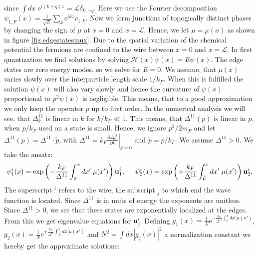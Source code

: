 since $\int dx\; \text{e}^{i(k + q)x} =\mathcal{L} \delta_{k,-q} $. Here we use the Fourier decomposition $\psi_{1,F}(x) = \frac{1}{\sqrt{L}}\sum_k\text{e}^{ikx}c_{1,k}$. Now we form junctions of topogically distinct phases by changing the sign of $\mu$ at $x = 0$ and $x = \mathcal{L}$. Hence, we let $\mu = \mu(x)$ as shown in figure \ref{fig.edgestatesmux}. Due to the spatial variation of the chemical potential the fermions are confined to the wire between $x = 0$ and $x = \mathcal{L}$. In first quantization we find solutions by solving $\mathcal{H}(x)\psi(x) = E\psi(x)$. The edge states are zero energy modes, so we solve for $E = 0$. We assume, that $\mu(x)$ varies slowly over the interparticle length scale $1/k_F$. When this is fulfilled the solution $\psi(x)$ will also vary slowly and hence the curvature of $\psi(x)$ proportional to $p^2\psi(x)$ is negligible. This means, that to a good approximation we only keep the operator $p$ up to first order. In the numerical analysis we will see, that $\Delta^{11}_k$ is linear in $k$ for $k/k_F \ll 1$. This means, that $\Delta^{11}(p)$ is linear in $p$, when $p/k_F$ used on a state is small. Hence, we ignore $p^2/2m_F$ and let $\Delta^{11}(p) = \Delta^{11} \cdot \tilde{p}$, with $\Delta^{11} = k_F\left.\frac{\partial \Delta^{11}_k}{\partial k}\right|_{k=0}$ and $\tilde{p} = p/k_F$. We assume $\Delta^{11} > 0$. We take the ansatz:
\begin{equation}
\psi^{i}_1(x) = \exp\left(-\frac{k_F}{\Delta^{11}}\int_{0}^{x} dx'\; \mu(x') \right)\mathbf{u}^{i}_{1}, \hspace{0.5cm} \psi^{i}_2(x) = \exp\left(+\frac{k_F}{\Delta^{11}}\int_{\mathcal{L}}^{x} dx'\; \mu(x') \right)\mathbf{u}^{i}_{2}, \nonumber
\end{equation}  
The superscript ${}^i$ refers to the wire, the subscript ${}_j$ to which end the wave function is located. Since $\Delta^{11}$ is in units of energy the exponents are unitless. Since $\Delta^{11} > 0$, we see that these states are exponentially localized at the edges. From this we get eigenvalue equations for $\mathbf{u}^{i}_{j}$. Defining $g_1(x) = \frac{1}{N}\text{e}^{-\frac{k_F}{\Delta^{11}}\int_{0}^{x} dx' \mu(x')}$, $g_2(x) = \frac{1}{N}\text{e}^{+\frac{k_F}{\Delta^{11}}\int_{\mathcal{L}}^{x} dx' \mu(x')}$ and $N^2 = \int dx |g_j(x)|^2$ a normalization constant we hereby get the approximate solutions:
